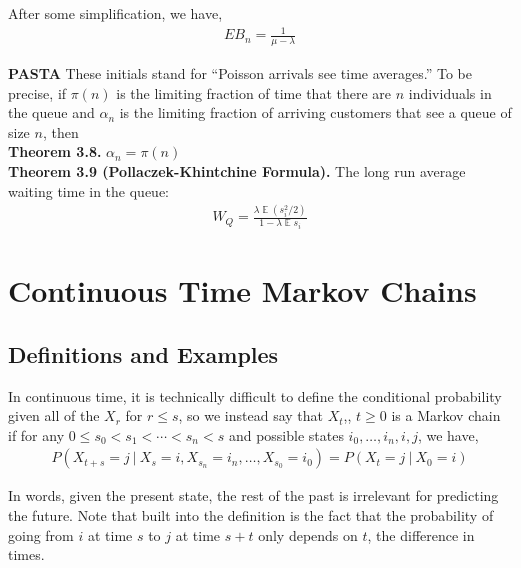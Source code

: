 \documentclass[12pt]{article}
\DeclareMathOperator*{\E}{\mathbb{E}}
\begin{document}
After some simplification, we have,
\begin{align*}
EB_n = \frac{1}{\mu - \lambda}
\end{align*}

\textbf{PASTA} These initials stand for ``Poisson arrivals see time averages.'' To be precise, if $\pi(n)$ is the limiting fraction of time that there are $n$ individuals in the queue and $\alpha_n$ is the limiting fraction of arriving customers that see a queue of size $n$, then\\

\textbf{Theorem 3.8.} $\alpha_n = \pi(n)$\\

\textbf{Theorem 3.9 (Pollaczek-Khintchine Formula).} The long run average waiting time in the queue:
\begin{align*}
W_Q = \frac{\lambda \E (s_i^2/2)}{1 - \lambda \E s_i}
\end{align*}

\newpage

\section{Continuous Time Markov Chains}

\subsection{Definitions and Examples}

In continuous time, it is technically difficult to define the conditional probability given all of the $X_r$ for $r \leq s$, so we instead say that $X_t$,, $t \geq 0$ is a Markov chain if for any $0 \leq s_0 < s_1 < \cdots < s_n < s$ and possible states $i_0, \ldots, i_n, i, j$, we have,
\begin{align*}
P(X_{t+s} = j \ | \ X_s = i, X_{s_n} = i_n, \ldots, X_{s_0} = i_0) = P(X_t = j \  | \ X_0 = i)
\end{align*}

In words, given the present state, the rest of the past is irrelevant for predicting the future. Note that built into the definition is the fact that the probability of going from $i$ at time $s$ to $j$ at time $s+t$ only depends on $t$, the difference in times.\\
\end{document}
